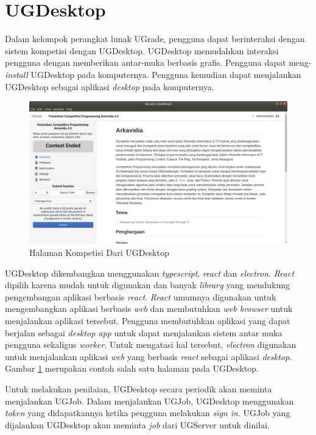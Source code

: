 \section{UGDesktop}

\par Dalam kelompok perangkat lunak UGrade, pengguna dapat berinteraksi dengan sistem kompetisi dengan UGDesktop. UGDesktop memudahkan interaksi pengguna dengan memberikan antar-muka berbasis grafis. Pengguna dapat meng-\textit{install} UGDesktop pada komputernya. Pengguna kemudian dapat menjalankan UGDesktop sebagai aplikasi \textit{desktop} pada komputernya.

\begin{figure}[ht!]
    \centering
    \includegraphics[width=\textwidth]{images/ugdesktop-example}
    \caption{Halaman Kompetisi Dari UGDesktop}
    \label{fig:ugdesktop-example}
\end{figure}

\par UGDesktop dikembangkan menggunakan \textit{typescript}, \textit{react} dan \textit{electron}. \textit{React} dipilih karena mudah untuk digunakan dan banyak \textit{library} yang mendukung pengembangan aplikasi berbasis \textit{react}. \textit{React} umumnya digunakan untuk mengembangkan aplikasi berbasis \textit{web} dan membutuhkan \textit{web browser} untuk menjalankan aplikasi tersebut. Pengguna membutuhkan aplikasi yang dapat berjalan sebagai \textit{desktop app} untuk dapat menjalankan sistem antar muka pengguna sekaligus \textit{worker}. Untuk mengatasi hal tersebut, \textit{electron} digunakan untuk menjalankan aplikasi \textit{web} yang berbasis \textit{react} sebagai aplikasi \textit{desktop}. Gambar \ref{fig:ugdesktop-example} merupakan contoh salah satu halaman pada UGDesktop.

\par Untuk melakukan penilaian, UGDesktop secara periodik akan meminta menjalankan UGJob. Dalam menjalankan UGJob, UGDesktop menggunakan \textit{token} yang didapatkannya ketika pengguna melakukan \textit{sign in}. UGJob yang dijalankan UGDesktop akan meminta \textit{job} dari UGServer untuk dinilai.

